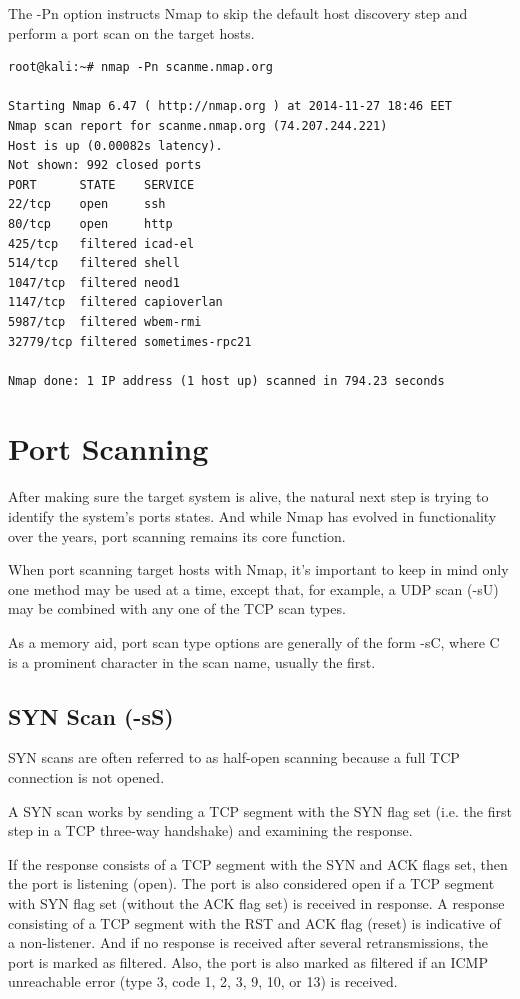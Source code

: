 \documentclass[a4paper,oneside,12pt]{book}
\begin{document}
The -Pn option instructs Nmap to skip the default host discovery step and perform a port scan on the target hosts.

\begin{lstlisting}[title=A Nmap scan using the No Ping option]
root@kali:~# nmap -Pn scanme.nmap.org

Starting Nmap 6.47 ( http://nmap.org ) at 2014-11-27 18:46 EET
Nmap scan report for scanme.nmap.org (74.207.244.221)
Host is up (0.00082s latency).
Not shown: 992 closed ports
PORT      STATE    SERVICE
22/tcp    open     ssh
80/tcp    open     http
425/tcp   filtered icad-el
514/tcp   filtered shell
1047/tcp  filtered neod1
1147/tcp  filtered capioverlan
5987/tcp  filtered wbem-rmi
32779/tcp filtered sometimes-rpc21

Nmap done: 1 IP address (1 host up) scanned in 794.23 seconds
\end{lstlisting}

\chapter{Port Scanning}

After making sure the target system is alive, the natural next step is trying to identify the system's ports states. And while Nmap has evolved in functionality over the years, port scanning remains its core function.

When port scanning target hosts with Nmap, it's important to keep in mind only one method may be used at a time, except that, for example, a UDP scan (-sU) may be combined with any one of the TCP scan types.

As a memory aid, port scan type options are generally of the form -sC, where C is a prominent character in the scan name, usually the first. 

\section{SYN Scan (-sS)}

SYN scans are often referred to as half-open scanning because a full TCP connection is not opened.

A SYN scan works by sending a TCP segment with the SYN flag set (i.e. the first step in a TCP three-way handshake) and examining the response.

If the response consists of a TCP segment with the SYN and ACK flags set, then the port is listening (open). The port is also considered open if a TCP segment with SYN flag set (without the ACK flag set) is received in response. A response consisting of a TCP segment with the RST and ACK flag (reset) is indicative of a non-listener. And if no response is received after several retransmissions, the port is marked as filtered. Also, the port is also marked as filtered if an ICMP unreachable error (type 3, code 1, 2, 3, 9, 10, or 13) is received.
\end{document}
